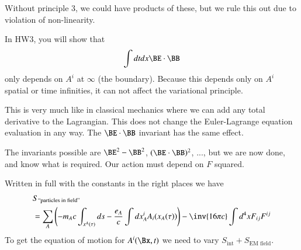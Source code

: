 Without principle 3, we could have products of these, but we rule this out due to violation of non-linearity.
%

In HW3, you will show that
%
\begin{equation}\label{eqn:relativisticElectrodynamicsL12b:350}
\int dt dx \BE \cdot \BB
\end{equation}
%
only depends on \(A^i\) at \(\infty\) (the boundary).  Because this depends only on \(A^i\) spatial or time infinities, it can not affect the variational principle.

This is very much like in classical mechanics where we can add any total derivative to the Lagrangian.  This does not change the Euler-Lagrange equation evaluation in any way.  The \(\BE \cdot \BB\) invariant has the same effect.

The invariants possible are \(\BE^2 - \BB^2\), \((\BE \cdot \BB)^2\), ..., but we are now done, and know what is required.  Our action must depend on \(F\) squared.

Written in full with the constants in the right places we have
%
\begin{equation}\label{eqn:relativisticElectrodynamicsL12b:370}
\begin{aligned}
&S_{\text{``particles in field''}} \\
&= \sum_A \left( -m_A c \int_{x^A(\tau)} ds - \frac{e_A}{c} \int dx^i_A A_i(x_A(\tau))
\right)
- \inv{16 \pi c} \int d^4 x F_{ij} F^{ij}
\end{aligned}
\end{equation}
%
To get the equation of motion for \(A^i(\Bx, t)\) we need to vary \(S_{\text{int}} + S_{\text{EM field}}\).
%
